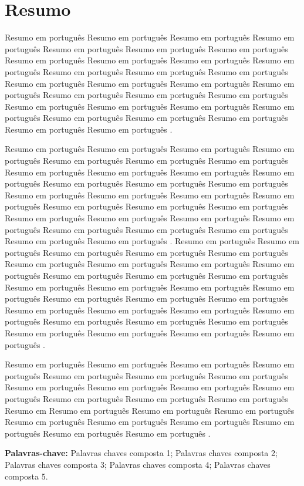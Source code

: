 \section*{Resumo}
Resumo em português Resumo em português Resumo em português Resumo em
português Resumo em português Resumo em português Resumo em português
Resumo em português Resumo em português Resumo em português Resumo em
português Resumo em português Resumo em português Resumo em português
Resumo em português Resumo em português Resumo em português Resumo em
português Resumo em português Resumo em português Resumo em português
Resumo em português Resumo em português Resumo em português Resumo em
português Resumo em português Resumo em português Resumo em português
Resumo em português Resumo em português .

Resumo em português Resumo em português Resumo em português Resumo em
português Resumo em português Resumo em português Resumo em português
Resumo em português Resumo em português Resumo em português Resumo em
português Resumo em português Resumo em português Resumo em português
Resumo em português Resumo em português Resumo em português Resumo em
português Resumo em português Resumo em português Resumo em português
Resumo em português Resumo em português Resumo em português Resumo em
português Resumo em português Resumo em português Resumo em português
Resumo em português Resumo em português . Resumo em português Resumo em português Resumo em português Resumo em
português Resumo em português Resumo em português Resumo em português
Resumo em português Resumo em português Resumo em português Resumo em
português Resumo em português Resumo em português Resumo em português
Resumo em português Resumo em português Resumo em português Resumo em
português Resumo em português Resumo em português Resumo em português
Resumo em português Resumo em português Resumo em português Resumo em
português Resumo em português Resumo em português Resumo em português
Resumo em português Resumo em português .


Resumo em português Resumo em português Resumo em português Resumo em
português Resumo em português Resumo em português Resumo em português
Resumo em português Resumo em português
Resumo em português Resumo em português Resumo em português Resumo em
português Resumo em português Resumo em
Resumo em português Resumo em português Resumo em português Resumo em
português Resumo em português Resumo em português Resumo em português
Resumo em português Resumo em português .


\vskip0.2in {\bf Palavras-chave:} Palavras chaves composta 1;  Palavras
chaves composta 2;
Palavras chaves composta 3;  Palavras chaves composta 4;
Palavras chaves composta 5.
